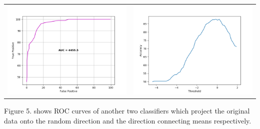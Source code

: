 \documentclass{article}
\begin{document}
\begin{center}
\begin{tabular}{cc}
\includegraphics[scale=0.25]{roc} &
\includegraphics[scale=0.25]{accuracy}
\end{tabular}
\end{center}

Figure 5. shows ROC curves of another two classifiers which project the original data onto the random direction and the direction connecting means respectively.
\end{document}
